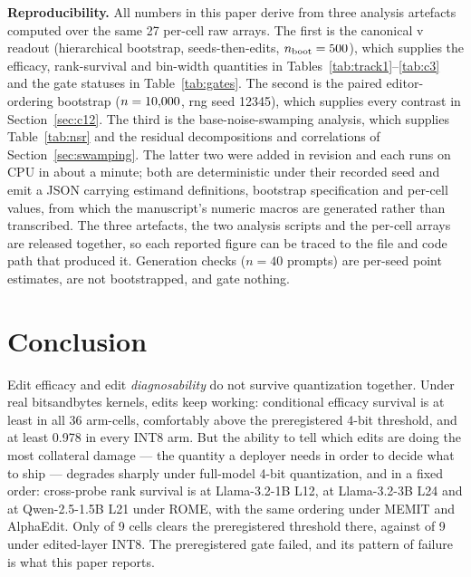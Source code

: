 \documentclass[preprint,12pt]{elsarticle}
\begin{document}
\textbf{Reproducibility.} All numbers in this paper derive from three analysis
artefacts computed over the same 27 per-cell raw arrays. The first is the canonical
v\pRepairVersion{} readout (hierarchical bootstrap, seeds-then-edits,
$n_{\mathrm{boot}}=500{}$), which supplies the efficacy, rank-survival and
bin-width quantities in Tables~\ref{tab:track1}--\ref{tab:c3} and the gate statuses in
Table~\ref{tab:gates}. The second is the paired editor-ordering bootstrap
($n=10{,}000{}$, rng seed 12345), which supplies every contrast in
Section~\ref{sec:c12}. The third is the base-noise-swamping analysis, which supplies
Table~\ref{tab:nsr} and the residual decompositions and correlations of
Section~\ref{sec:swamping}. The latter two were added in revision and each runs on CPU
in about a minute; both are deterministic under their recorded seed and emit a JSON
carrying estimand definitions, bootstrap specification and per-cell values, from which
the manuscript's numeric macros are generated rather than transcribed. The three
artefacts, the two analysis scripts and the per-cell arrays are released together, so
each reported figure can be traced to the file and code path that produced it.
Generation checks ($n=40$ prompts) are per-seed point estimates, are not bootstrapped,
and gate nothing.

\section{Conclusion}
\label{sec:conclusion}

Edit efficacy and edit \emph{diagnosability} do not survive quantization together. Under
real bitsandbytes kernels, edits keep working: conditional efficacy survival is at least
\pMinCondAll{} in all 36 arm-cells, comfortably above the preregistered
\pEsrSurvFourThreshold{} 4-bit threshold, and at least 0.978 in every INT8 arm. But the
ability to tell which edits are doing the most collateral damage --- the quantity a
deployer needs in order to decide what to ship --- degrades sharply under full-model
4-bit quantization, and in a fixed order: cross-probe rank survival is
\pFlatNfFMLOneRome{} at Llama-3.2-1B L12, \pFlatNfFMLThreeRome{} at Llama-3.2-3B L24 and
\pFlatNfFMQOneRome{} at Qwen-2.5-1.5B L21 under ROME, with the same ordering under MEMIT
and AlphaEdit. Only \pNPassNfFM{} of 9 cells clears the preregistered
\pRankSurvFourThreshold{} threshold there, against \pNPassIntEL{} of 9 under
edited-layer INT8. The preregistered gate failed, and its pattern of failure is what
this paper reports.
\end{document}
